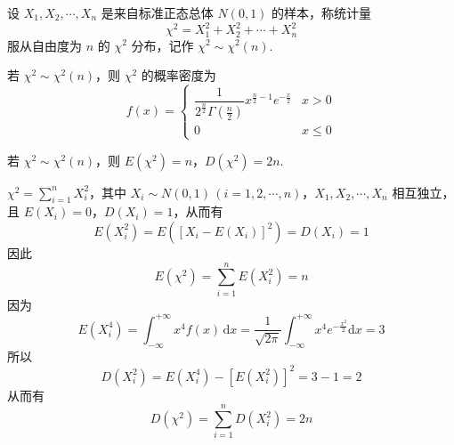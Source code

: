 \begin{definition}
    设 $X_1, X_2, \cdots, X_n$ 是来自标准正态总体 $N(0,1)$ 的样本，称统计量
    $$
    \chi^2 = X_1^2 + X_2^2 + \cdots + X_n^2
    $$
    服从自由度为 $n$ 的 $\chi^2$ 分布，记作 $\chi^2 \sim \chi^2(n)$.
\end{definition}

若 $\chi^2 \sim \chi^2(n)$，则 $\chi^2$ 的概率密度为
$$
f(x) = \begin{cases}
    \dfrac{1}{2^{\frac{n}{2}} \Gamma(\frac{n}{2})} x^{\frac{n}{2} - 1} e^{-\frac{x}{2}} & x>0 \\
    0 & x \leqslant 0
\end{cases}
$$

\setcounter{propertyname}{0}

\begin{property}
    若 $\chi^2 \sim \chi^2(n)$，则 $E(\chi^2) = n$，$D(\chi^2) = 2n$.
\end{property}

\begin{myproof}
    $\chi^2 = \displaystyle\sum_{i=1}^n X_i^2$，其中 $X_i \sim N(0,1) \, (i=1,2,\cdots,n)$，$X_1, X_2, \cdots, X_n$ 相互独立，且 $E(X_i) = 0$，$D(X_i) = 1$，从而有
    $$
    E(X_i^2) = E([X_i - E(X_i)]^2) = D(X_i) = 1
    $$
    因此
    $$
    E(\chi^2) = \sum_{i=1}^n E(X_i^2) = n
    $$
    因为
    $$
    E(X_i^4) = \int_{-\infty}^{+\infty} x^4 f(x) \, \text{d}x = \dfrac{1}{\sqrt{2 \pi}} \int_{-\infty}^{+\infty} x^4 e^{-\frac{x^2}{2}} \text{d}x = 3
    $$
    所以
    $$
    D(X_i^2) = E(X_i^4) - [E(X_i^2)]^2 = 3-1 = 2
    $$
    从而有
    $$
    D(\chi^2) = \sum_{i=1}^n D(X_i^2) = 2n
    $$
\end{myproof}